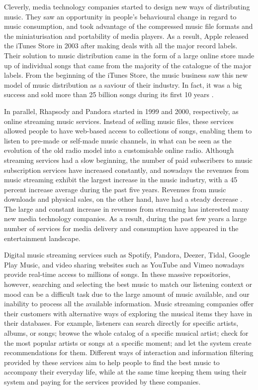 Cleverly, media technology companies started to design new ways of distributing music. They saw an opportunity in people's behavioural change in regard to music consumption, and took advantage of the compressed music file formats and the miniaturisation and portability of media players. As a result, Apple released the iTunes Store in 2003 after making deals with all the major record labels. Their solution to music distribution came in the form of a large online store made up of individual songs that came from the majority of the catalogue of the major labels. From the beginning of the iTunes Store, the music business saw this new model of music distribution as a saviour of their industry. In fact, it was a big success and sold more than 25 billion songs during its first 10 years \autocite{apple13itunes}.

In parallel, Rhapsody and Pandora started in 1999 and 2000, respectively, as online streaming music services. Instead of selling music files, these services allowed people to have web-based access to collections of songs, enabling them to listen to pre-made or self-made music channels, in what can be seen as the evolution of the old radio model into a customisable online radio. Although streaming services had a slow beginning, the number of paid subscribers to music subscription services have increased constantly, and nowadays the revenues from music streaming exhibit the largest increase in the music industry, with a 45 percent increase average during the past five years. 
Revenues from music downloads and physical sales, on the other hand, have had a steady decrease \autocite{ifpi16global}. 
The large and constant increase in revenues from streaming has interested many new media technology companies. As a result, during the past few years a large number of services for media delivery and consumption have appeared in the entertainment landscape. 

Digital music streaming services such as Spotify, Pandora, Deezer, Tidal, Google Play Music, and video sharing websites such as YouTube and Vimeo nowadays provide real-time access to millions of songs. 
In these massive repositories, however, searching and selecting the best music to match our listening context or mood can be a difficult task due to the large amount of music available, and our inability to process all the available information. 
Music streaming companies offer their customers with alternative ways of exploring the musical items they have in their databases. For example, listeners can search directly for specific artists, albums, or songs; browse the whole catalog of a specific musical artist; check for the most popular artists or songs at a specific moment; and let the system create recommendations for them. Different ways of interaction and information filtering provided by these services aim to help people to find the best music to accompany their everyday life, while at the same time keeping them using their system and paying for the services provided by these companies.


